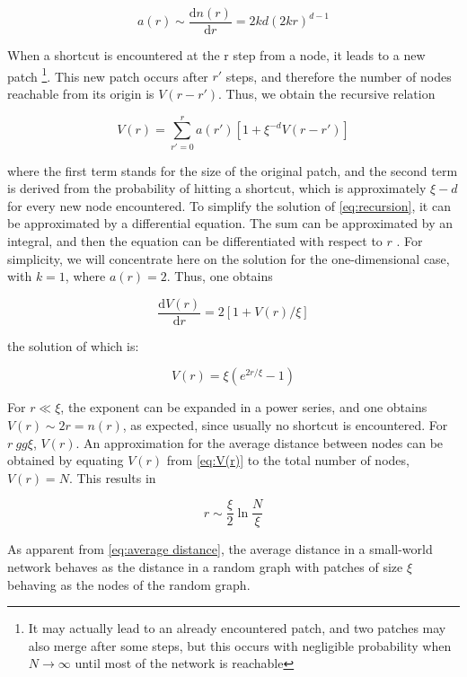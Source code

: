 \begin{equation}
    a(r) \sim \frac{\text{d} n(r)}{\text{d} r} = 2kd(2kr)^{d-1}
\end{equation}

\nd When a shortcut is encountered at the r step from a node, it leads to a new patch \footnote{It may actually lead to an already encountered patch, and two patches may also merge after some steps, but this occurs with negligible probability when $N \to \infty$ until most of the network is reachable}. This new patch occurs after $r'$ steps, and therefore the number of nodes reachable from its origin is $V (r - r')$. Thus, we obtain the recursive relation

\begin{equation} \label{eq:recursion}
    V(r) = \sum_{r'=0}^r a(r') [1 + \xi^{-d}V(r-r')]
\end{equation}

\nd where the first term stands for the size of the original patch, and the second term is derived from the probability of hitting a shortcut, which is approximately $\xi -d $ for every new node encountered. To simplify the solution of \ref{eq:recursion}, it can be approximated by a differential equation. The sum can be approximated by an integral, and then the equation can be differentiated with respect to $r$ . For simplicity, we will concentrate here on the solution for the one-dimensional case, with $k = 1$, where $a(r) = 2$. Thus, one obtains

\begin{equation}
    \frac{\text{d} V(r)}{\text{d} r} = 2 [1 + V(r)/\xi]
\end{equation}

\nd the solution of which is:

\begin{equation} \label{eq:V(r)}
    V(r) = \xi \left(e^{2r/\xi} -1\right)
\end{equation}

\nd For $r \ll \xi$, the exponent can be expanded in a power series, and one obtains $V(r) \sim 2r = n(r)$, as expected, since usually no shortcut is encountered. For $r \ gg \xi$, $V(r)$. An approximation for the average distance between nodes can be obtained by equating $V(r)$ from \ref*{eq:V(r)} to the total number of nodes, $V(r) = N$. This results in

\begin{equation} \label{eq:average distance}
    r \sim \frac{\xi}{2} \ln \frac{N}{\xi}
\end{equation}

\nd As apparent from \ref{eq:average distance}, the average distance in a small-world network behaves as the distance in a random graph with patches of size $\xi$ behaving as the nodes of the random graph.

